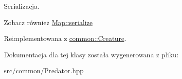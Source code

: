 Serializacja. 

\begin{DoxySeeAlso}{Zobacz również}
\hyperlink{classcommon_1_1Map_adea5eca91ec93db01ec5920bb26a3fd3}{Map\-::serialize} 
\end{DoxySeeAlso}


Reimplementowana z \hyperlink{classcommon_1_1Creature_a975a4df236259ce2d72126c040c5cce0}{common\-::\-Creature}.



Dokumentacja dla tej klasy została wygenerowana z pliku\-:\begin{DoxyCompactItemize}
\item 
src/common/Predator.\-hpp\end{DoxyCompactItemize}
